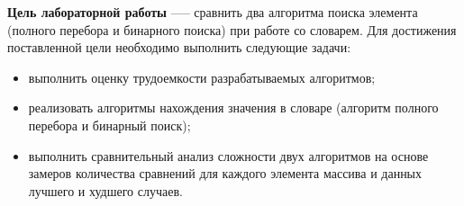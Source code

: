 \clearpage{}

\textbf{Цель лабораторной работы} —-- сравнить два алгоритма поиска элемента (полного перебора и бинарного поиска) при работе со словарем. Для достижения поставленной цели необходимо выполнить следующие задачи:

\begin{itemize}
    \item выполнить оценку трудоемкости разрабатываемых алгоритмов;
    \item реализовать алгоритмы нахождения значения в словаре (алгоритм полного перебора и бинарный поиск);
    \item выполнить сравнительный анализ сложности двух алгоритмов на основе замеров количества сравнений для каждого элемента массива и данных лучшего и худшего случаев.
\end{itemize}


